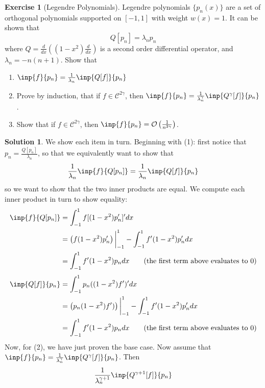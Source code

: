 \documentclass[12pt]{article}
\theoremstyle{definition}
\newtheorem{exercise}{\color{YellowOrange}Exercise}
\theoremstyle{definition}
\newtheorem{solution}{\color{Goldenrod}Solution}
\begin{document}
\begin{exercise}[Legendre Polynomials]
	Legendre polynomials $\{p_n(x)\}$ are a set of orthogonal polynomials supported on $[-1,1]$ with weight $w(x) = 1$. It can be shown that 
	\begin{equation}
		Q[p_n] = \lambda_np_n
	\end{equation}
	where $Q = \frac{d}{dx}\left((1-x^2)\frac{d}{dx}\right)$ is a second order differential operator, and $\lambda_n = -n(n+1)$. Show that
	\begin{enumerate}
		\item $\inp{f}{p_n} = \frac{1}{\lambda_n} \inp{Q[f]}{p_n}$
		\item Prove by induction, that if $f \in \mathcal{C}^{2\gamma}$, then $\inp{f}{p_n} = \frac{1}{\lambda_n^\gamma} \inp{Q^\gamma[f]}{p_n}$.
		\item Show that if $f \in \mathcal{C}^{2\gamma}$, then $\inp{f}{p_n} = \mathcal{O}\left(\frac{1}{n^{2\gamma}}\right)$.
	\end{enumerate}
\end{exercise}
\begin{solution}
	We show each item in turn. Beginning with (1): first notice that $p_n = \frac{Q[p_n]}{\lambda_n}$, so that we equivalently want to show that
	\begin{equation}
		\frac{1}{\lambda_n} \inp{f}{Q[p_n]} = \frac{1}{\lambda_n}\inp{Q[f]}{p_n}
	\end{equation}
	so we want to show that the two inner products are equal. We compute each inner product in turn to show equality:
	\begin{align*}
		\inp{f}{Q[p_n]} &= \int_{-1}^1 f [(1-x^2)p_n']' dx \\
		&= \left(f(1-x^2)p_n'\right)\bigg\vert_{-1}^1 - \int_{-1}^1 f' (1-x^2)p_n' dx \\
		&= \int_{-1}^1 f' (1-x^2)p_n dx \tag{the first term above evaluates to $0$}
	\end{align*}
	\begin{align*}
		\inp{Q[f]}{p_n} &= \int_{-1}^1 p_n ((1-x^2)f')' dx \\
		&= \left(p_n(1-x^2)f')\right)\bigg\vert_{-1}^1 - \int_{-1}^1 f' (1-x^2)p_n' dx \\
		&= \int_{-1}^1 f' (1-x^2)p_n dx \tag{the first term above evaluates to $0$}
	\end{align*}
	Now, for (2), we have just proven the base case. Now assume that $\inp{f}{p_n} = \frac{1}{\lambda_n^\gamma} \inp{Q^\gamma[f]}{p_n}$. Then
	\begin{align*}
		 \frac{1}{\lambda_n^{\gamma+1}} \inp{Q^{\gamma+1}[f]}{p_n}
	\end{align*}
\end{solution}
\end{document}
